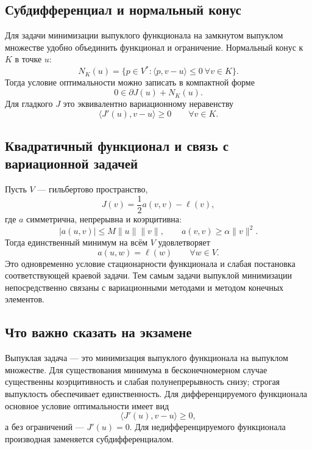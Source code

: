 \subsection{Субдифференциал и нормальный конус}

Для задачи минимизации выпуклого функционала на замкнутом выпуклом множестве
удобно объединить функционал и ограничение. Нормальный конус к $K$ в точке $u$:
\[
N_K(u)=\{p\in V^*: \langle p,v-u\rangle\le0\ \forall v\in K\}.
\]
Тогда условие оптимальности можно записать в компактной форме
\[
    0\in \partial J(u)+N_K(u).
\]
Для гладкого $J$ это эквивалентно вариационному неравенству
\[
    \langle J'(u),v-u\rangle\ge0\qquad \forall v\in K.
\]

\subsection{Квадратичный функционал и связь с вариационной задачей}

Пусть $V$ --- гильбертово пространство,
\[
    J(v)=\frac12 a(v,v)-\ell(v),
\]
где $a$ симметрична, непрерывна и коэрцитивна:
\[
|a(u,v)|\le M\|u\|\|v\|,\qquad
 a(v,v)\ge \alpha\|v\|^2.
\]
Тогда единственный минимум на всём $V$ удовлетворяет
\[
    a(u,w)=\ell(w)\qquad \forall w\in V.
\]
Это одновременно условие стационарности функционала и слабая постановка
соответствующей краевой задачи. Тем самым задачи выпуклой минимизации непосредственно
связаны с вариационными методами и методом конечных элементов.

\subsection{Что важно сказать на экзамене}

Выпуклая задача --- это минимизация выпуклого функционала на выпуклом множестве.
Для существования минимума в бесконечномерном случае существенны коэрцитивность
и слабая полунепрерывность снизу; строгая выпуклость обеспечивает единственность.
Для дифференцируемого функционала основное условие оптимальности имеет вид
\[
    \langle J'(u),v-u\rangle\geq0,
\]
а без ограничений --- $J'(u)=0$. Для недифференцируемого функционала производная
заменяется субдифференциалом.

\newpage
